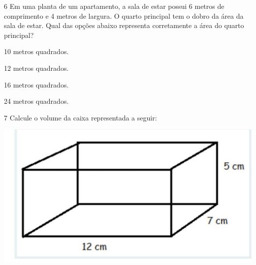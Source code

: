 
\num{6} Em uma planta de um apartamento, a sala de estar possui 6 metros de
comprimento e 4 metros de largura. O quarto principal tem o dobro da
área da sala de estar. Qual das opções abaixo representa corretamente a
área do quarto principal?

\begin{escolha}
\item 10 metros quadrados.
\item 12 metros quadrados.
\item 16 metros quadrados.
\item 24 metros quadrados.
\end{escolha}




\num{7} Calcule o volume da caixa representada a seguir:

\includegraphics{./imgSAEB_7_MAT/media/image99.jpg}

